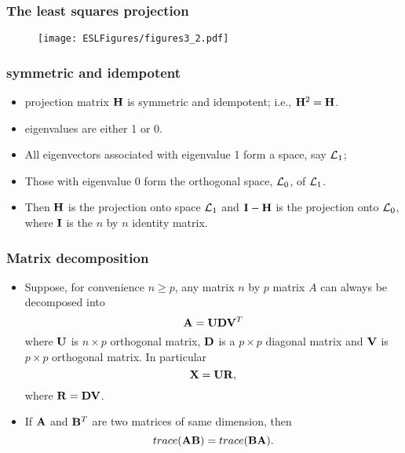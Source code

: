 \documentclass{beamer}
\def\bfA{{\bf A}}
\def\bfB{{\bf B}}
\begin{document}
      
     
     
     \begin{frame}
     	\frametitle{The least squares projection}
     	\begin{figure}[h]
     		\centering
     		\texttt{[image: ESLFigures/figures3\_2.pdf]}	 	 
     	\end{figure}	
     \end{frame}
     
      \begin{frame}
      	\frametitle{symmetric and idempotent}
      	\begin{itemize}
      		\item 
      		projection matrix ${\bf H}$ is symmetric and idempotent; i.e., ${\bf H}^2 = {\bf H}$.
      		\item   eigenvalues are either 1 or 0.
      		\item	All eigenvectors associated with eigenvalue 1 form a space, say ${\cal L}_1$; 
      		\item Those with
      		eigenvalue 0 form the orthogonal space,  ${\cal L}_0$, of ${\cal L}_1$. 
      		\item Then $\bf H$ is the projection
      		onto space ${\cal L}_1$ and ${\bf I} - {\bf H}$ is the projection onto ${\cal L}_0$, where
      		${\bf I}$ is the $n$ by $n$ identity matrix.
      	\end{itemize}
      \end{frame}
      
      \begin{frame}
      	\frametitle{Matrix decomposition  }
      	
      	\begin{itemize}
      		\item 
      		Suppose, for convenience $n \geq p$, any matrix $n$ by $p$ matrix $A$ can always be decomposed into
      		$${\bf A}= {\bf U} {\bf D}{\bf V}^T $$
      		where ${\bf U}$ is $n\times p$  orthogonal matrix, ${\bf D}$ is a $p\times p$ diagonal matrix and
      		${\bf V}$ is $p\times p$ orthogonal matrix. In particular
      		$$ {\bf X} = {\bf U} {\bf R}, $$
      		where ${\bf R}= {\bf D}{ \bf V}$.
      		
      		\item	If $\bfA$ and $\bfB^T$ are two matrices of same dimension,   then
      		$$trace (\bfA \bfB)=  trace(\bfB \bfA).$$
      	\end{itemize}
      \end{frame}
      
\end{document}
